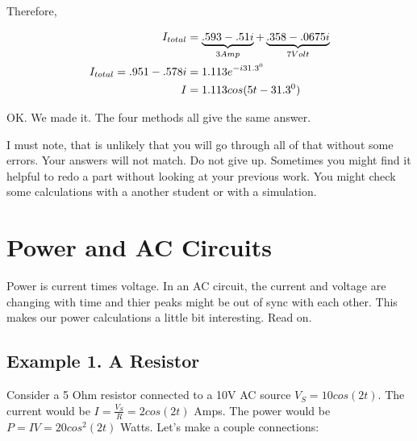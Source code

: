 \documentclass{book}
\numberwithin{equation}{section}
\theoremstyle{definition}
\begin{document}
Therefore,

\begin{align}
I_{total} &=\underbrace{.593-.51i}_{3 Amp}+\underbrace{.358-.0675i}_{7 Volt}\\
I_{total}=.951-.578i&=1.113e^{-i31.3^0}\notag\\
I &= 1.113cos(5t-31.3^0)
\end{align}

OK. We made it. The four methods all give the same answer. \par

I must note, that is unlikely that you will go through all of that without some errors. Your answers will not match. Do not give up. Sometimes you might find it helpful to redo a part without looking at your previous work. You might check some calculations with a another student or with a simulation. 

\section{Power and AC Circuits}
Power is current times voltage. In an AC circuit, the current and voltage are changing with time and thier peaks might be out of sync with each other. This makes our power calculations a little bit interesting. Read on.\par

\subsection{Example 1. A Resistor}
Consider a 5 Ohm resistor connected to a 10V AC source $V_S=10cos(2t)$. The current would be $I=\frac{V_S}{R}=2cos(2t)$ Amps. The power would be $P=IV=20cos^2(2t) $ Watts. Let's make a couple connections:
\end{document}
